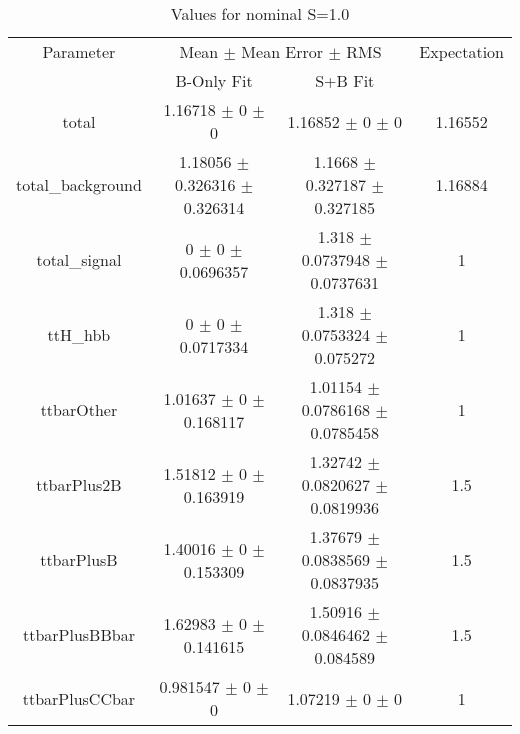 \begin{table}
\centering
\caption{Values for nominal S=1.0}
\begin{tabular}{cccc}
\toprule
Parameter & \multicolumn{2}{c}{Mean $\pm$ Mean Error $\pm$ RMS} & Expectation\\
 & B-Only Fit & S+B Fit & \\
\midrule
total & \num{1.16718} $\pm$ \num{0} $\pm$ \num{0} & \num{1.16852} $\pm$ \num{0} $\pm$ \num{0} & \num{1.16552}\\
total\_background & \num{1.18056} $\pm$ \num{0.326316} $\pm$ \num{0.326314} & \num{1.1668} $\pm$ \num{0.327187} $\pm$ \num{0.327185} & \num{1.16884}\\
total\_signal & \num{0} $\pm$ \num{0} $\pm$ \num{0.0696357} & \num{1.318} $\pm$ \num{0.0737948} $\pm$ \num{0.0737631} & \num{1}\\
ttH\_hbb & \num{0} $\pm$ \num{0} $\pm$ \num{0.0717334} & \num{1.318} $\pm$ \num{0.0753324} $\pm$ \num{0.075272} & \num{1}\\
ttbarOther & \num{1.01637} $\pm$ \num{0} $\pm$ \num{0.168117} & \num{1.01154} $\pm$ \num{0.0786168} $\pm$ \num{0.0785458} & \num{1}\\
ttbarPlus2B & \num{1.51812} $\pm$ \num{0} $\pm$ \num{0.163919} & \num{1.32742} $\pm$ \num{0.0820627} $\pm$ \num{0.0819936} & \num{1.5}\\
ttbarPlusB & \num{1.40016} $\pm$ \num{0} $\pm$ \num{0.153309} & \num{1.37679} $\pm$ \num{0.0838569} $\pm$ \num{0.0837935} & \num{1.5}\\
ttbarPlusBBbar & \num{1.62983} $\pm$ \num{0} $\pm$ \num{0.141615} & \num{1.50916} $\pm$ \num{0.0846462} $\pm$ \num{0.084589} & \num{1.5}\\
ttbarPlusCCbar & \num{0.981547} $\pm$ \num{0} $\pm$ \num{0} & \num{1.07219} $\pm$ \num{0} $\pm$ \num{0} & \num{1}\\
\bottomrule
\end{tabular}
\end{table}